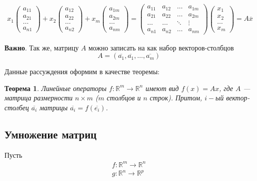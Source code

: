 \documentclass[]{article}
\newtheorem{thr}{Теорема}
\begin{document}
	\begin{gather*}
		x_1
	\begin{pmatrix}
		a_{11}
		\\
		a_{21}
		\\
		\ldots
		\\
		a_{n1}
	\end{pmatrix}
	+
	x_2
	\begin{pmatrix}
		a_{12}
		\\
		a_{22}
		\\
		\ldots
		\\
		a_{n2}
	\end{pmatrix}
	+
	x_m
	\begin{pmatrix}
		a_{1m}
		\\
		a_{2m}
		\\
		\ldots
		\\
		a_{nm}
	\end{pmatrix}
	=
	\begin{pmatrix}
		a_{11} & a_{12} & \ldots & a_{1m}
		\\
		a_{21} & a_{22} & \ldots & a_{2m}
		\\
		\ldots & \ldots & \ddots & \vdots
		\\
		a_{n1} & a_{n2} & \ldots & a_{nm}
	\end{pmatrix}
	\begin{pmatrix}
		x_{1}
		\\
		x_{2}
		\\
		\ldots
		\\
		x_{m}
	\end{pmatrix}
	=A\overline{x}
\end{gather*}

\textbf{Важно}. Так же, матрицу $A$ можно записать на как набор векторов-столбцов
\begin{equation*}
	A=(\overline{a_1},\overline{a_1},\ldots,\overline{a_m})
\end{equation*}

Данные рассуждения оформим в качестве теоремы:
\begin{thr}\label{th1}
	Линейные операторы $f:\mathbb{R}^m\rightarrow\mathbb{R}^n$ имеют вид $f(x)=Ax$, где $A$ --- матрица размерности $n\times m$ ($m$ столбцов и $n$ строк). Притом, $i-$ый вектор-столбец $\overline{a_i}$ матрицы $\overline{a_i}=f(\overline{e_i})$.
\end{thr}

\subsection{Умножение матриц}
Пусть \begin{gather*}
	f:\mathbb{R}^m\rightarrow\mathbb{R}^n
	\\
	g:\mathbb{R}^n\rightarrow\mathbb{R}^p
\end{gather*}
\end{document}
